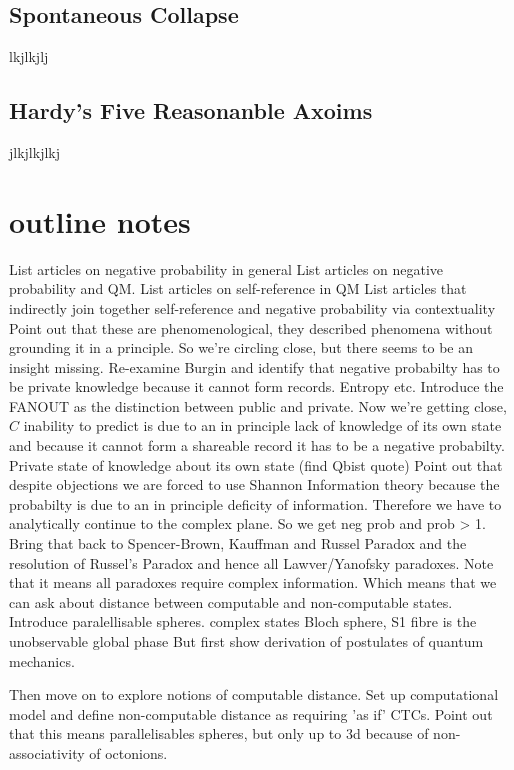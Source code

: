 \documentclass{article}
\begin{document}
\subsection{Spontaneous Collapse}
lkjlkjlj
\subsection{Hardy's Five Reasonanble Axoims}
jlkjlkjlkj
\subsection{}

\section{outline notes}
List articles on negative probability in general
List articles on negative probability and QM.
List articles on self-reference in QM
List articles that indirectly join together self-reference and negative probability via contextuality
Point out that these are phenomenological, they described phenomena without grounding it in a principle.
So we're circling close, but there seems to be an insight missing.
Re-examine Burgin and identify that negative probabilty has to be private knowledge because it cannot form records. Entropy etc. Introduce the FANOUT as the distinction between public and private.
Now we're getting close, $C$ inability to predict is due to an in principle lack of knowledge of its own state and because it cannot form a shareable record it has to be a negative probabilty. Private state of knowledge about its own state (find Qbist quote)
Point out that despite objections we are forced to use Shannon Information theory because the probabilty is due to an in principle deficity of information. Therefore we have to analytically continue to the complex plane. So we get neg prob and prob > 1.
Bring that back to Spencer-Brown, Kauffman and Russel Paradox and the resolution of Russel's Paradox and hence all Lawver/Yanofsky paradoxes.
Note that it means all paradoxes require complex information. Which means that we can ask about distance between computable and non-computable states.
Introduce paralellisable spheres. complex states Bloch sphere, S1 fibre is the unobservable global phase
But first show derivation of postulates of quantum mechanics.

Then move on to explore notions of computable distance. Set up computational model and define non-computable distance as requiring 'as if' CTCs. Point out that this means parallelisables spheres, but only up to 3d because of non-associativity of octonions.
\end{document}
